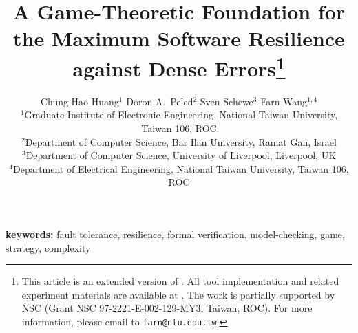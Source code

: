 \documentclass[times,10pt,twocolumn]{article}
\begin{document}
\baselineskip 20pt

\title{A Game-Theoretic Foundation for the Maximum Software Resilience  \\
against Dense Errors\thanks{
This article is an extended version of \cite{HPSW/12/rapidRecovery}. 
All tool implementation and related experiment materials 
are available at .
The work is partially supported by NSC 
(Grant NSC 97-2221-E-002-129-MY3, Taiwan, ROC).
For more information, please email to {\tt farn@ntu.edu.tw}.
}
}
\label{reply1.tgg}

\author{
Chung-Hao Huang$^1$
\hspace*{5mm} 
Doron A.\ Peled$^2$ \hspace*{5mm} 
Sven Schewe$^3$ \hspace*{5mm} 
Farn Wang$^{1,4}$ 
\\[5mm]
$^1$Graduate Institute of Electronic Engineering, 
National Taiwan University, Taiwan 106, ROC\\[2.5mm]
$^2$Department of Computer Science, 
Bar Ilan University, Ramat Gan, Israel\\[2.5mm]
$^3$Department of Computer Science, 
University of Liverpool, Liverpool, UK\\[2.5mm]
$^4$Department of Electrical Engineering,
National Taiwan University, Taiwan 106, ROC
}

\date{}


\maketitle




\noindent
{\bf keywords:}
fault tolerance, resilience, formal verification, model-checking, game, strategy, complexity

\end{document}
